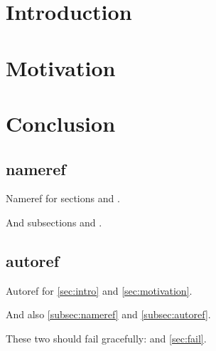 \documentclass{article}
\begin{document}
\section{Introduction}\label{sec:intro}
\section{Motivation}\label{sec:motivation}
\section{Conclusion}\label{sec:conclusion}

\subsection{nameref}\label{subsec:nameref}
Nameref for sections  and .

And subsections  and .

\subsection{autoref}\label{subsec:autoref}
Autoref for \autoref{sec:intro} and \autoref{sec:motivation}.

And also \autoref{subsec:nameref} and \autoref{subsec:autoref}.

These two should fail gracefully:  and \autoref{sec:fail}.
\end{document}
